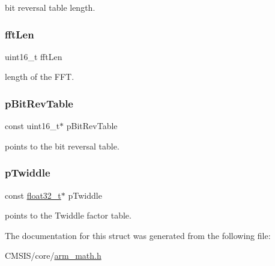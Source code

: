 bit reversal table length. \mbox{\label{structarm__cfft__instance__f32_ab8db3bbe7c61e6bb8ca2a55e3446e11a}} 
\subsubsection{\texorpdfstring{fftLen}{fftLen}}
{\footnotesize\ttfamily uint16\+\_\+t fft\+Len}

length of the F\+FT. \mbox{\label{structarm__cfft__instance__f32_a3b229432d381b0a511a9cdbe3aa74e78}} 
\subsubsection{\texorpdfstring{pBitRevTable}{pBitRevTable}}
{\footnotesize\ttfamily const uint16\+\_\+t$\ast$ p\+Bit\+Rev\+Table}

points to the bit reversal table. \mbox{\label{structarm__cfft__instance__f32_a8292d9775f5c5472f59915649fe3b378}} 
\subsubsection{\texorpdfstring{pTwiddle}{pTwiddle}}
{\footnotesize\ttfamily const \mbox{\hyperlink{arm__math_8h_a4611b605e45ab401f02cab15c5e38715}{float32\+\_\+t}}$\ast$ p\+Twiddle}

points to the Twiddle factor table. 

The documentation for this struct was generated from the following file\+:\begin{DoxyCompactItemize}
\item 
C\+M\+S\+I\+S/core/\mbox{\hyperlink{arm__math_8h}{arm\+\_\+math.\+h}}\end{DoxyCompactItemize}
